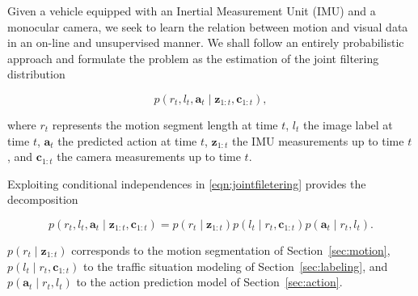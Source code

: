 Given a vehicle equipped with an Inertial Measurement Unit (IMU) and a monocular
camera, we seek to learn the relation between motion and visual data in an
on-line and unsupervised manner. We shall follow an entirely probabilistic
approach and formulate the problem as the estimation of the joint filtering
distribution

\begin{equation}
\label{eqn:jointfiletering}
p(r_t,l_t,\mathbf{a}_t\mid\mathbf{z}_{1:t},\mathbf{c}_{1:t}),
\end{equation}

where $r_t$ represents the motion segment length at time $t$, $l_t$ the image
label at time $t$, $\mathbf{a}_t$ the predicted action at time $t$,
$\mathbf{z}_{1:t}$ the IMU measurements up to time $t$, and $\mathbf{c}_{1:t}$
the camera measurements up to time $t$.

Exploiting conditional independences in \eqref{eqn:jointfiletering} provides the
decomposition

\begin{equation}
\label{eqn:jointdecomposition}
p(r_t,l_t,\mathbf{a}_t\mid\mathbf{z}_{1:t},\mathbf{c}_{1:t})=
p(r_t\mid\mathbf{z}_{1:t})p(l_t\mid r_t,\mathbf{c}_{1:t})
p(\mathbf{a}_t\mid r_t,l_t).
\end{equation}

$p(r_t\mid\mathbf{z}_{1:t})$ corresponds to the motion segmentation of
Section~\ref{sec:motion}, $p(l_t\mid r_t,\mathbf{c}_{1:t})$ to the traffic situation
modeling of Section~\ref{sec:labeling}, and $p(\mathbf{a}_t\mid r_t,l_t)$ to the action
prediction model of Section~\ref{sec:action}.

